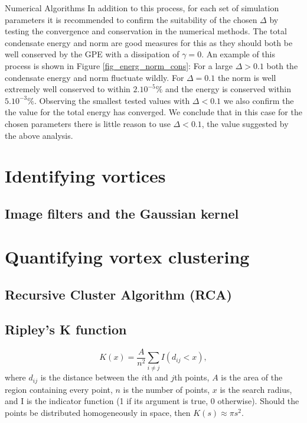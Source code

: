 \begin{chapter}{\label{cha:numerics}Numerical Algorithms}
	In addition to this process, for each set of simulation parameters it is recommended to confirm the suitability of the chosen $\Delta$ by testing the convergence and conservation in the numerical methods. The total condensate energy and norm are good measures for this as they should both be well conserved by the GPE with a dissipation of $\gamma=0$. An example of this process is shown in Figure \ref{fig_energ_norm_cons}: For a large $\Delta>0.1$ both the condensate energy and norm fluctuate wildly. For $\Delta=0.1$ the norm is well extremely well conserved to within $2.10^{-5}\%$ and the energy is conserved within $5.10^{-3}\%$. Observing the smallest tested values with $\Delta<0.1$ we also confirm the the value for the total energy has converged. We conclude that in this case for the chosen parameters there is little reason to use $\Delta<0.1$, the value suggested by the above analysis.

\section{\label{section:vortexidentifying} Identifying vortices}


\subsection{\label{section:gaussianblur} Image filters and the Gaussian kernel}

\section{\label{section:vortexclustering} Quantifying vortex clustering}
	\subsection{\label{section:reevesalgorithm} Recursive Cluster Algorithm (RCA) }
		


	\subsection{\label{section:ripleysk} Ripley's K function }
		\begin{equation}\label{eq:ripleysk}
		K(x) = \frac{A}{n^2}\sum\limits_{i \ne j} I\left (d_{ij}<x\right ),
		\end{equation}
		where $d_{ij}$ is the distance between the $i$th and $j$th points, $A$ is the area of the region containing every point, $n$ is the number of points, $x$ is the search radius, and I is the indicator function (1 if its argument is true, 0 otherwise). Should the points be distributed homogeneously in space, then $K(s)\approx\pi s^2$.

\end{chapter}
